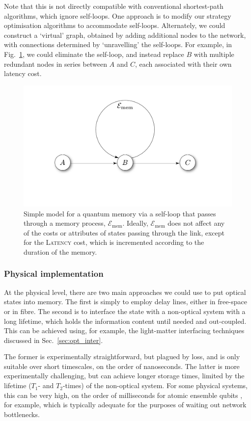 \documentclass[aps, rmp, twocolumn, amsmath, amssymb, nofootinbib, superscriptaddress, longbibliography, floatfix, table-of-contents, eqsecnum]{revtex4-1}
\begin{document}
Note that this is not directly compatible with conventional shortest-path algorithms, which ignore self-loops. One approach is to modify our strategy optimisation algorithms to accommodate self-loops. Alternately, we could construct a `virtual' graph, obtained by adding additional nodes to the network, with connections determined by `unravelling' the self-loops. For example, in Fig.~\ref{fig:memory}, we could eliminate the self-loop, and instead replace $B$ with multiple redundant nodes in series between $A$ and $C$, each associated with their own latency cost.

\begin{figure}[!htb]
\includegraphics[width=0.7\columnwidth]{memory}
\caption{Simple model for a quantum memory via a self-loop that passes through a memory process, $\mathcal{E}_\text{mem}$. Ideally, $\mathcal{E}_\text{mem}$ does not affect any of the costs or attributes of states passing through the link, except for the \textsc{Latency} cost, which is incremented according to the duration of the memory.} \label{fig:memory}
\end{figure}

%
%

\subsubsection{Physical implementation}

At the physical level, there are two main approaches we could use to put optical states into memory. The first is simply to employ delay lines, either in free-space or in fibre. The second is to interface the state with a non-optical system with a long lifetime, which holds the information content until needed and out-coupled. This can be achieved using, for example, the light-matter interfacing techniques discussed in Sec.~\ref{sec:opt_inter}.

The former is experimentally straightforward, but plagued by loss, and is only suitable over short timescales, on the order of nanoseconds. The latter is more experimentally challenging, but can achieve longer storage times, limited by the lifetime ($T_1$- and $T_2$-times) of the non-optical system. For some physical systems, this can be very high, on the order of milliseconds for atomic ensemble qubits \cite{bib:Duan01, bib:Duan02, bib:LauratKimble07}, for example, which is typically adequate for the purposes of waiting out network bottlenecks.
\end{document}
